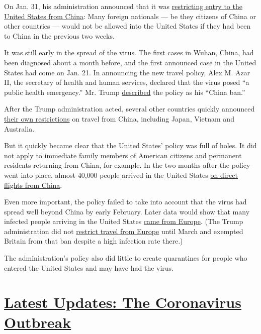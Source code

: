 On Jan. 31, his administration announced that it was
\href{https://www.nytimes.com/2020/01/31/business/china-travel-coronavirus.html}{restricting
entry to the United States from China}: Many foreign nationals --- be
they citizens of China or other countries --- would not be allowed into
the United States if they had been to China in the previous two weeks.

It was still early in the spread of the virus. The first cases in Wuhan,
China, had been diagnosed about a month before, and the first announced
case in the United States had come on Jan. 21. In announcing the new
travel policy, Alex M. Azar II, the secretary of health and human
services, declared that the virus posed ``a public health emergency.''
Mr. Trump
\href{https://twitter.com/realdonaldtrump/status/1249519742093864961}{described}
the policy as his ``China ban.''

After the Trump administration acted, several other countries quickly
announced
\href{https://www.nytimes.com/2020/02/01/world/asia/china-coronavirus-us-australia.html}{their
own restrictions} on travel from China, including Japan, Vietnam and
Australia.

But it quickly became clear that the United States' policy was full of
holes. It did not apply to immediate family members of American citizens
and permanent residents returning from China, for example. In the two
months after the policy went into place, almost 40,000 people arrived in
the United States
\href{https://www.nytimes.com/2020/04/04/us/coronavirus-china-travel-restrictions.html}{on
direct flights from China}.

Even more important, the policy failed to take into account that the
virus had spread well beyond China by early February. Later data would
show that many infected people arriving in the United States
\href{https://www.nytimes.com/2020/04/08/science/new-york-coronavirus-cases-europe-genomes.html}{came
from Europe}. (The Trump administration did not
\href{https://www.nytimes.com/2020/03/11/us/politics/anthony-fauci-coronavirus.html}{restrict
travel from Europe} until March and exempted Britain from that ban
despite a high infection rate there.)

The administration's policy also did little to create quarantines for
people who entered the United States and may have had the virus.

\hypertarget{latest-updates-the-coronavirus-outbreak}{%
\section{\texorpdfstring{\href{https://www.nytimes.com/2020/08/07/world/covid-19-news.html?action=click\&pgtype=Article\&state=default\&region=MAIN_CONTENT_1\&context=storylines_live_updates}{Latest
Updates: The Coronavirus
Outbreak}}{Latest Updates: The Coronavirus Outbreak}}\label{latest-updates-the-coronavirus-outbreak}}

